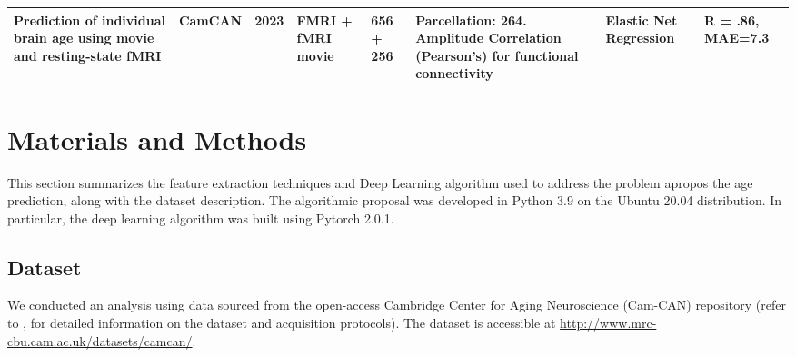 \documentclass{cys}
\begin{document}
\begin{table}[]
{{\begin{tabular}{llllllll}
Prediction of individual brain age using movie and resting-state fMRI                                                                                                                          \cite{bi2024prediction} & CamCAN                                                                                                                                         & 2023          & FMRI + fMRI movie  & 656 + 256                                                                                                          & Parcellation: 264. Amplitude Correlation (Pearson’s) for functional connectivity                                                                                                                                                                                                                                                                                                                                                                                          & Elastic Net Regression                                                                                                                                                                          & R = .86, MAE=7.3                                                                                                                                                                    \\ \hline
\end{tabular}
}}
	\label{table:Table1}
\end{table}

\section{Materials and Methods}
\label{sec:Materials}

This section summarizes the feature extraction techniques and Deep Learning algorithm used to address the problem apropos the age prediction, along with the dataset description. The algorithmic proposal was developed in Python 3.9 on the Ubuntu 20.04 distribution. In particular, the deep learning algorithm was built using Pytorch 2.0.1.

\subsection{Dataset}
\label{subsec: Dataset}
We conducted an analysis using data sourced from the open-access Cambridge Center for Aging Neuroscience (Cam-CAN) repository (refer to \cite{shafto2014cambridge, taylor2017cambridge}, for detailed information on the dataset and acquisition protocols). The dataset is accessible at \url{http://www.mrc-cbu.cam.ac.uk/datasets/camcan/}.
\end{document}

